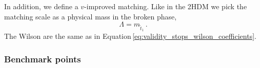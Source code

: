 
In addition, we define a $v$-improved matching. Like in the 2HDM we pick the matching scale as a physical mass in the broken phase,
%
\begin{equation}
  \Lambda = m_{\tilde{t}_{1}} \,.
\end{equation}
%
The Wilson are the same as in
Equation\,\eqref{eq:validity_stops_wilson_coefficients}.



\subsubsection{Benchmark points}

